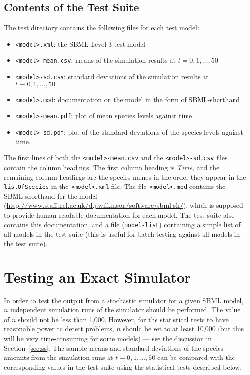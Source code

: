 \documentclass[12pt,a4paper]{article}
\begin{document}
\subsection{Contents of the Test Suite}

The test directory contains the following files for each test model: 
\begin{itemize}
\item \verb$<model>.xml$: the SBML Level 3 test model
\item \verb$<model>-mean.csv$: means of the simulation results at $t = 0,1,\ldots,50$
\item \verb$<model>-sd.csv$: standard deviations of the simulation results at $t = 0,1,\ldots,50$
\item \verb$<model>.mod$: documentation on the model in the form of SBML-shorthand
\item \verb$<model>-mean.pdf$: plot of mean species levels against time 
\item \verb$<model>-sd.pdf$: plot of the standard deviations of the species levels against time. 
\end{itemize}
The first lines of both the \verb$<model>-mean.csv$ and the
\verb$<model>-sd.csv$ files contain the column headings. The first
column heading is \emph{Time}, and the remaining column headings are
the species names in the order they appear in the \verb$listOfSpecies$
in the \verb$<model>.xml$ file. The file \verb$<model>.mod$ contains
the SBML-shorthand for the model
(\url{http://www.staff.ncl.ac.uk/d.j.wilkinson/software/sbml-sh/}),
which is supposed to provide human-readable documentation for each
model. The test suite also contains this documentation, and a file
(\verb$model-list$) containing a simple list of all models in the test
suite (this is useful for batch-testing against all models in the test
suite).

\section{Testing an Exact Simulator}

In order to test the output from a stochastic simulator for a given
SBML model, $n$ independent simulation runs of the simulator should be
performed. The value of $n$ should not be less than 1,000. However,
for the statistical tests to have reasonable power to detect problems,
$n$ should be set to at least 10,000 (but this will be very
time-consuming for some models) --- see the discussion in
Section~\ref{sec:ss}. The sample means and standard
deviations of the species amounts from the simulation runs at
$t=0,1,\ldots,50$ can be compared with the corresponding values in the
test suite using the statistical tests described below.
\end{document}
